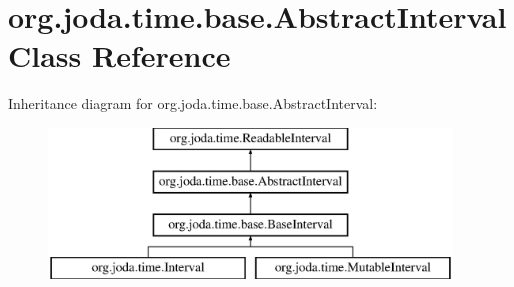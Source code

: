 \hypertarget{classorg_1_1joda_1_1time_1_1base_1_1_abstract_interval}{\section{org.\-joda.\-time.\-base.\-Abstract\-Interval Class Reference}
\label{classorg_1_1joda_1_1time_1_1base_1_1_abstract_interval}
}
Inheritance diagram for org.\-joda.\-time.\-base.\-Abstract\-Interval\-:\begin{figure}[H]
\begin{center}
\leavevmode
\includegraphics[height=4.000000cm]{classorg_1_1joda_1_1time_1_1base_1_1_abstract_interval}
\end{center}
\end{figure}
